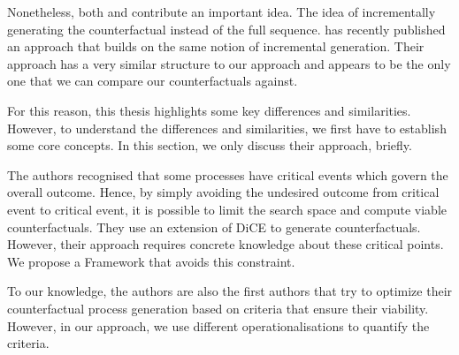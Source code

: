 \documentclass[./../../paper.tex]{subfiles}
\begin{document}
Nonetheless, both \citeauthor{tsirtsis_CounterfactualExplanationsSequential_2021} and \citeauthor{oberst_CounterfactualOffPolicyEvaluation_2019} contribute an important idea. The idea of incrementally generating the counterfactual instead of the full sequence. \citeauthor{hsieh_DiCE4ELInterpretingProcess_2021} has recently published an approach that builds on the same notion of incremental generation. Their approach has a very similar structure to our approach and appears to be the only one that we can compare our counterfactuals against. 

For this reason, this thesis highlights some key differences and similarities. However, to understand the differences and similarities, we first have to establish some core concepts.  In this section, we only discuss their approach, briefly.

The authors recognised that some processes have critical events which govern the overall outcome. Hence, by simply avoiding the undesired outcome from critical event to critical event, it is possible to limit the search space and compute viable counterfactuals. They use an extension of DiCE\cite{mothilal_ExplainingMachineLearning_2020} to generate counterfactuals. However, their approach requires concrete knowledge about these critical points. We propose a Framework that avoids this constraint. 

To our knowledge, the authors are also the first authors that try to optimize their counterfactual process generation based on criteria that ensure their viability. However, in our approach, we use different operationalisations to quantify the criteria.






\end{document}
